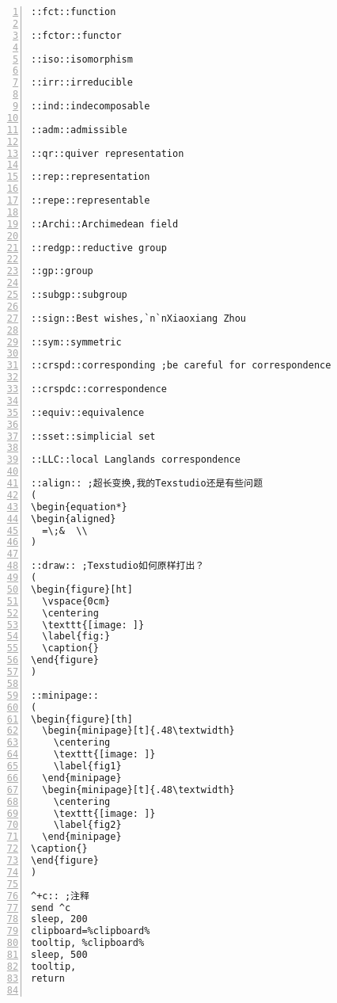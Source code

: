 \documentclass[11pt]{amsart}
\begin{document}
\begin{lstlisting}[numbers=left,numberstyle=\tiny,numbersep=10pt]
::fct::function

::fctor::functor

::iso::isomorphism

::irr::irreducible

::ind::indecomposable

::adm::admissible

::qr::quiver representation

::rep::representation

::repe::representable 

::Archi::Archimedean field

::redgp::reductive group

::gp::group

::subgp::subgroup

::sign::Best wishes,`n`nXiaoxiang Zhou

::sym::symmetric

::crspd::corresponding ;be careful for correspondence

::crspdc::correspondence

::equiv::equivalence

::sset::simplicial set

::LLC::local Langlands correspondence

::align:: ;超长变换,我的Texstudio还是有些问题
(
\begin{equation*}
\begin{aligned}
  =\;&  \\
)

::draw:: ;Texstudio如何原样打出？
(
\begin{figure}[ht]
  \vspace{0cm}
  \centering
  \texttt{[image: ]}
  \label{fig:}
  \caption{}
\end{figure}
)

::minipage::
(
\begin{figure}[th]
  \begin{minipage}[t]{.48\textwidth}
    \centering
    \texttt{[image: ]}
    \label{fig1}
  \end{minipage}
  \begin{minipage}[t]{.48\textwidth}
    \centering
    \texttt{[image: ]}
    \label{fig2}
  \end{minipage}
\caption{}
\end{figure}
)

^+c:: ;注释
send ^c
sleep, 200
clipboard=%clipboard%
tooltip, %clipboard%
sleep, 500
tooltip,
return


\end{lstlisting}
\end{document}

